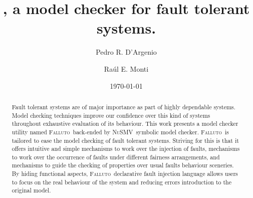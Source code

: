 \documentclass{llncs2e/llncs}
\title{\falluto, a model checker for fault tolerant systems.}
\author{ Pedro R. D'Argenio \and Ra\'ul E. Monti}
\institute{FaMAF, Universidad Nacional de C\'ordoba -- CONICET}
\date{\today}
\newcommand{\nusmvSp}{\mbox{\textsc{NuSMV~}}}
\newcommand{\fallutoSp}{\nohyphens{\textsc{Falluto~}}}  %
\begin{document}
\maketitle
\begin{abstract}
Fault tolerant systems are of major importance as part of highly dependable 
systems. Model checking techniques improve our confidence over this kind of
systems throughout exhaustive evaluation of its behaviour. This work presents
a model checker utility named \fallutoSp back-ended by 
\nusmvSp symbolic model checker. \fallutoSp is
tailored to ease the model checking of fault tolerant systems. Striving for
this is that it offers intuitive and simple mechanisms to work over the 
injection of faults, mechanisms to work over the occurrence of faults under
different fairness arrangements, and mechanisms to guide the checking of 
properties over usual faults behaviour sceneries. By hiding functional
aspects, \fallutoSp declarative fault injection language
allows users to
focus on the real behaviour of the system and reducing errors introduction
to the original model.
\end{abstract}


\end{document}
